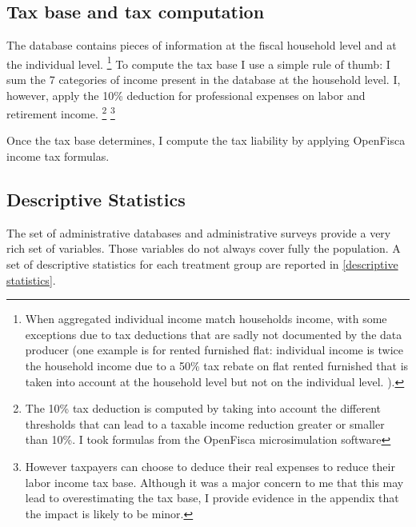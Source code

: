 \subsection{Tax base and tax computation}
The database contains pieces of information at the fiscal household level and at the individual level.
\footnote{When aggregated individual income match households income, with some exceptions due to tax deductions that are sadly not documented by the data producer (one example is for  rented furnished flat: individual income is twice the household income due to a 50\% tax rebate on flat rented furnished that is taken into account at the household level but not on the individual level. ). }
To compute the tax base I use a simple rule of thumb: I sum the 7 categories of income present in the database at the household level. I, however, apply the 10\% deduction for professional expenses on labor and retirement income.
\footnote{The 10\% tax deduction is computed by taking into account the different thresholds that can lead to a taxable income reduction greater or smaller than 10\%. I took formulas from the OpenFisca microsimulation software}
\footnote{However taxpayers can choose to deduce their real expenses to reduce their labor income tax base. Although it was a major concern to me that this may lead to overestimating the tax base, I provide evidence in the appendix that the impact is likely to be minor.} 

Once the tax base determines, I compute the tax liability by applying OpenFisca income tax formulas.
 



\subsection{Descriptive Statistics}
The set of administrative databases and administrative surveys provide a very rich set of variables. Those variables do not always cover fully the population. A set of descriptive statistics for each treatment group are reported in \autoref{descriptive statistics}.

